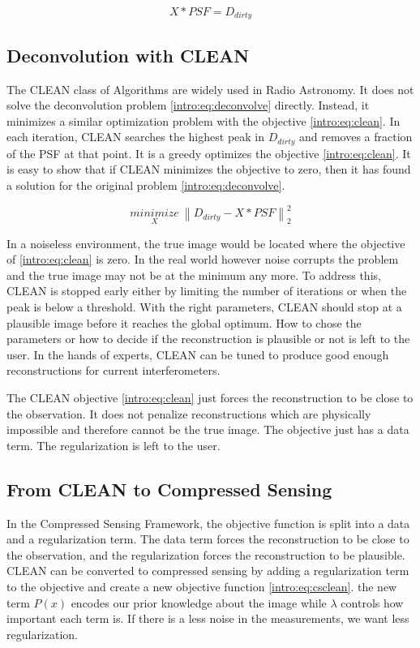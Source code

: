 \begin{equation}\label{intro:eq:deconvolve}
X \ast  PSF = D_{dirty} 
\end{equation}


\subsection{Deconvolution with CLEAN}
The CLEAN class of Algorithms\cite{hogbom1974aperture}\cite{schwab1984relaxing}\cite{rich2008multi}\cite{rau2011multi} are widely used in Radio Astronomy. It does not solve the deconvolution problem \eqref{intro:eq:deconvolve} directly. Instead, it minimizes a similar optimization problem with the objective  \eqref{intro:eq:clean}. In each iteration, CLEAN searches the highest peak in $D_{dirty}$ and removes a fraction of the PSF at that point. It is a greedy optimizes the objective \eqref{intro:eq:clean}. It is easy to show that if CLEAN minimizes the objective to zero, then it has found a solution for the original problem \eqref{intro:eq:deconvolve}. 

\begin{equation}\label{intro:eq:clean}
\underset{X}{minimize} \: \left \| D_{dirty} - X \ast PSF \right \|_2^2
\end{equation}

In a noiseless environment, the true image would be located where the objective of \eqref{intro:eq:clean} is zero. In the real world however noise corrupts the problem and the true image may not be at the minimum any more. To address this, CLEAN is stopped early either by limiting the number of iterations or when the peak is below a threshold. With the right parameters, CLEAN should stop at a plausible image before it reaches the global optimum. How to chose the parameters or how to decide if the reconstruction is plausible or not is left to the user. In the hands of experts, CLEAN can be tuned to produce good enough reconstructions for current interferometers. 

The CLEAN objective \eqref{intro:eq:clean} just forces the reconstruction to be close to the observation. It does not penalize reconstructions which are physically impossible and therefore cannot be the true image. The objective just has a data term. The regularization is left to the user. 


\subsection{From CLEAN to Compressed Sensing}
In the Compressed Sensing Framework, the objective function is split into a data and a regularization term. The data term forces the reconstruction to be close to the observation, and the regularization forces the reconstruction to be plausible. CLEAN can be converted to compressed sensing by adding a regularization term to the objective and create a new objective function \eqref{intro:eq:csclean}. the new term $P(x)$ encodes our prior knowledge about the image while $\lambda$ controls how important each term is. If there is a less noise in the measurements, we want less regularization.

